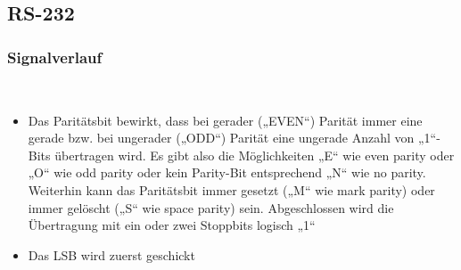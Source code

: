 \subsection{RS-232}
\subsubsection{Signalverlauf}
	\\
  \begin{itemize}
    \item Das Paritätsbit bewirkt, dass bei gerader („EVEN“) Parität immer eine
    gerade bzw. bei ungerader („ODD“) Parität eine ungerade Anzahl von „1“-Bits übertragen wird. Es gibt also die Möglichkeiten „E“ wie even parity oder „O“ wie odd parity oder kein Parity-Bit entsprechend „N“ wie no parity. Weiterhin kann das Paritätsbit immer gesetzt („M“ wie mark parity) oder immer gelöscht („S“ wie space parity) sein. Abgeschlossen wird die Übertragung mit ein oder zwei Stoppbits logisch „1“
    \item Das LSB wird zuerst geschickt
  \end{itemize}
